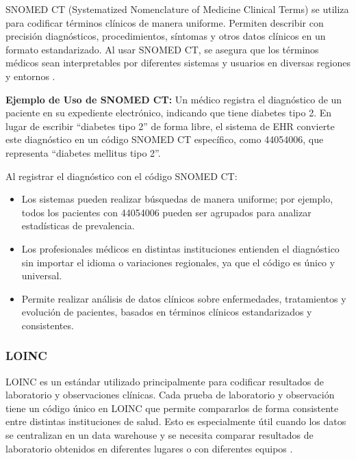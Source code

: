 \documentclass[12pt, a4paper, twoside]{article}
\begin{document}
	SNOMED CT (Systematized Nomenclature of Medicine Clinical Terms) se utiliza para codificar términos clínicos de manera uniforme. Permiten describir con precisión diagnósticos, procedimientos, síntomas y otros datos clínicos en un formato estandarizado. Al usar SNOMED CT, se asegura que los términos médicos sean interpretables por diferentes sistemas y usuarios en diversas regiones y entornos \cite{sanidadSNOMEDCT}.
	
	\textbf{Ejemplo de Uso de SNOMED CT:} Un médico registra el diagnóstico de un paciente en su expediente electrónico, indicando que tiene diabetes tipo 2. En lugar de escribir “diabetes tipo 2” de forma libre, el sistema de EHR convierte este diagnóstico en un código SNOMED CT específico, como 44054006, que representa “diabetes mellitus tipo 2”\cite{bioportalSNOMEDCT}.
	
	Al registrar el diagnóstico con el código SNOMED CT:
	
	\begin{itemize}
		\item Los sistemas pueden realizar búsquedas de manera uniforme; por ejemplo, todos los pacientes con 44054006 pueden ser agrupados para analizar estadísticas de prevalencia.
		
		\item Los profesionales médicos en distintas instituciones entienden el diagnóstico sin importar el idioma o variaciones regionales, ya que el código es único y universal.
		
		\item Permite realizar análisis de datos clínicos sobre enfermedades, tratamientos y evolución de pacientes, basados en términos clínicos estandarizados y consistentes.
	\end{itemize}
	
	\subsubsection{LOINC}
	
	LOINC es un estándar utilizado principalmente para codificar resultados de laboratorio y observaciones clínicas. Cada prueba de laboratorio y observación tiene un código único en LOINC que permite compararlos de forma consistente entre distintas instituciones de salud. Esto es especialmente útil cuando los datos se centralizan en un data warehouse y se necesita comparar resultados de laboratorio obtenidos en diferentes lugares o con diferentes equipos \cite{meditecsInteroperabilidad}.
	
\end{document}
